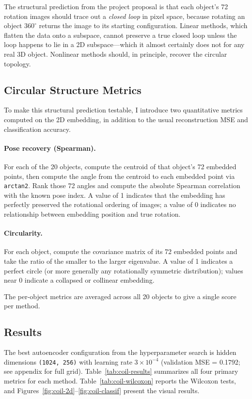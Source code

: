 \documentclass[11pt]{article}
\begin{document}
The structural prediction from the project proposal is that each object's 72 rotation images should trace out a \emph{closed loop} in pixel space, because rotating an object $360^\circ$ returns the image to its starting configuration. Linear methods, which flatten the data onto a subspace, cannot preserve a true closed loop unless the loop happens to lie in a 2D subspace---which it almost certainly does not for any real 3D object. Nonlinear methods should, in principle, recover the circular topology.

\subsection{Circular Structure Metrics}

To make this structural prediction testable, I introduce two quantitative metrics computed on the 2D embedding, in addition to the usual reconstruction MSE and classification accuracy.

\paragraph{Pose recovery (Spearman).} For each of the 20 objects, compute the centroid of that object's 72 embedded points, then compute the angle from the centroid to each embedded point via \texttt{arctan2}. Rank those 72 angles and compute the absolute Spearman correlation with the known pose index. A value of 1 indicates that the embedding has perfectly preserved the rotational ordering of images; a value of 0 indicates no relationship between embedding position and true rotation.

\paragraph{Circularity.} For each object, compute the covariance matrix of its 72 embedded points and take the ratio of the smaller to the larger eigenvalue. A value of 1 indicates a perfect circle (or more generally any rotationally symmetric distribution); values near 0 indicate a collapsed or collinear embedding.

The per-object metrics are averaged across all 20 objects to give a single score per method.

\subsection{Results}

The best autoencoder configuration from the hyperparameter search is hidden dimensions \texttt{(1024, 256)} with learning rate $3 \times 10^{-4}$ (validation MSE = 0.1792; see appendix for full grid). Table~\ref{tab:coil-results} summarizes all four primary metrics for each method. Table~\ref{tab:coil-wilcoxon} reports the Wilcoxon tests, and Figures~\ref{fig:coil-2d}--\ref{fig:coil-classif} present the visual results.
\end{document}
